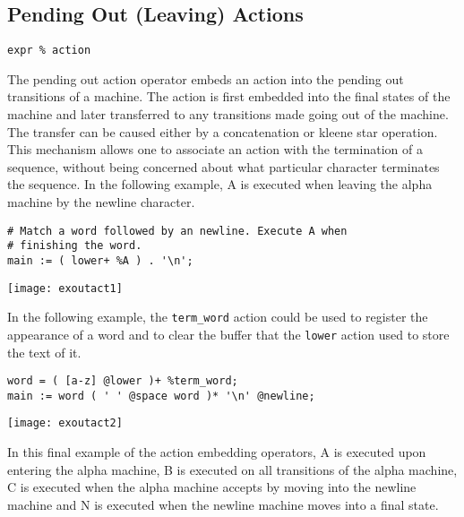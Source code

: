 \documentclass[letterpaper,11pt,oneside]{book}
\newcommand{\verbspace}{\vspace{10pt}}
\newcommand{\graphspace}{\vspace{10pt}}
\newenvironment{inline_code}{\def\baselinestretch{1}\vspace{12pt}\small}{}
\begin{document}
\subsection{Pending Out (Leaving) Actions}
\label{out-actions}

\verb|expr % action|
\verbspace

The pending out action operator embeds an action into the pending out
transitions of a machine. The action is first embedded into the final states of
the machine and later transferred to any transitions made going out of the
machine. The transfer can be caused either by a concatenation or kleene star
operation.  This mechanism allows one to associate an action with the
termination of a sequence, without being concerned about what particular
character terminates the sequence.  In the following example, A is executed
when leaving the alpha machine by the newline character.

\begin{inline_code}
\begin{verbatim}
# Match a word followed by an newline. Execute A when 
# finishing the word.
main := ( lower+ %A ) . '\n';
\end{verbatim}
\end{inline_code}

\graphspace
\begin{center}
\texttt{[image: exoutact1]}
\end{center}
\graphspace

In the following example, the \verb|term_word| action could be used to register
the appearance of a word and to clear the buffer that the \verb|lower| action used
to store the text of it.

\begin{inline_code}
\begin{verbatim}
word = ( [a-z] @lower )+ %term_word;
main := word ( ' ' @space word )* '\n' @newline;
\end{verbatim}
\end{inline_code}

\graphspace
\begin{center}
\texttt{[image: exoutact2]}
\end{center}
\graphspace


In this final example of the action embedding operators, A is executed upon
entering the alpha machine, B is executed on all transitions of the alpha
machine, C is executed when the alpha machine accepts by moving into the
newline machine and N is executed when the newline machine moves into a final
state.  
\end{document}
